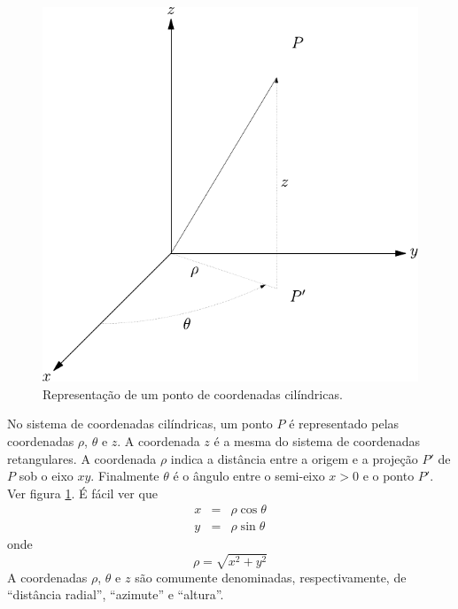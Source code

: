 \begin{figure}%
   \includegraphics{./cap_algvet/pics/coordenadas_cilindricas}
   \caption{Representação de um ponto de coordenadas cilíndricas.}\label{Coo_cil}   
      \label{fig:coordenadas_cilindricas}
  \end{figure}


No sistema de coordenadas cilíndricas, um ponto $P$ é representado pelas coordenadas $\rho$, $\theta$ e $z$. A coordenada $z$ é a mesma do sistema de coordenadas retangulares. A coordenada $\rho$ indica a distância entre a origem e a projeção $P'$ de $P$ sob o eixo $xy$. Finalmente $\theta$ é o ângulo entre o semi-eixo $x>0$ e o ponto $P'$. Ver figura \ref{fig:coordenadas_cilindricas}. É fácil ver que
\begin{subequations}\label{xphi}
\begin{eqnarray}
x&=&\rho\cos\theta\\
y&=&\rho\sin\theta
\end{eqnarray}  
\end{subequations}
onde
\begin{equation}
\rho=\sqrt{x^2+y^2}
\end{equation}
A coordenadas $\rho$, $\theta$ e $z$ são comumente denominadas, respectivamente, de ``distância radial'', ``azimute'' e ``altura''. 

